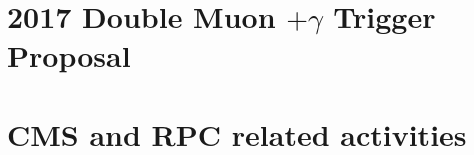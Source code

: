 
\chapter{2017 Double Muon $+ \gamma$ Trigger Proposal} \label{2017Trigger}
\chapter{CMS and RPC related activities} \label{CMSRPCActivities}

